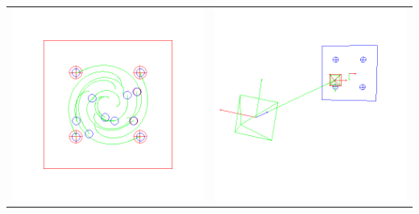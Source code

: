 {\begin{center}
\begin{tabular}{cc}
  \includegraphics[height=0.1\textheight]{figures/plots/ex4cimage.png}&
  \includegraphics[height=0.1\textheight]{figures/plots/ex4cscene.png}\\

\end{tabular}
\end{center}}
